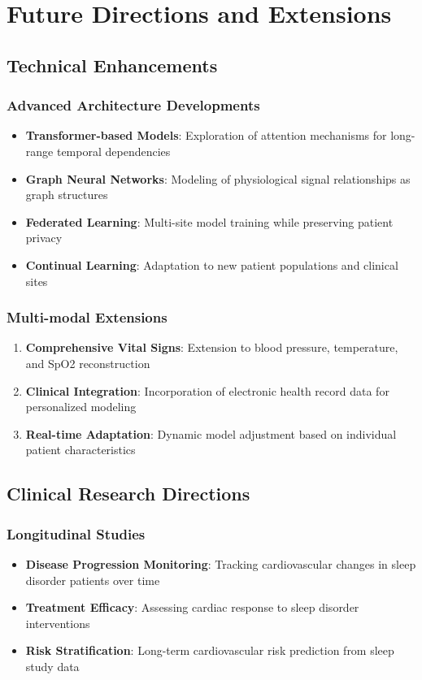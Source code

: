 \documentclass[11pt]{article}
\begin{document}
\section{Future Directions and Extensions}
\label{sec:future}

\subsection{Technical Enhancements}

\subsubsection{Advanced Architecture Developments}
\begin{itemize}
    \item \textbf{Transformer-based Models}: Exploration of attention mechanisms for long-range temporal dependencies
    \item \textbf{Graph Neural Networks}: Modeling of physiological signal relationships as graph structures
    \item \textbf{Federated Learning}: Multi-site model training while preserving patient privacy
    \item \textbf{Continual Learning}: Adaptation to new patient populations and clinical sites
\end{itemize}

\subsubsection{Multi-modal Extensions}
\begin{enumerate}
    \item \textbf{Comprehensive Vital Signs}: Extension to blood pressure, temperature, and SpO2 reconstruction
    \item \textbf{Clinical Integration}: Incorporation of electronic health record data for personalized modeling
    \item \textbf{Real-time Adaptation}: Dynamic model adjustment based on individual patient characteristics
\end{enumerate}

\subsection{Clinical Research Directions}

\subsubsection{Longitudinal Studies}
\begin{itemize}
    \item \textbf{Disease Progression Monitoring}: Tracking cardiovascular changes in sleep disorder patients over time
    \item \textbf{Treatment Efficacy}: Assessing cardiac response to sleep disorder interventions
    \item \textbf{Risk Stratification}: Long-term cardiovascular risk prediction from sleep study data
\end{itemize}
\end{document}

